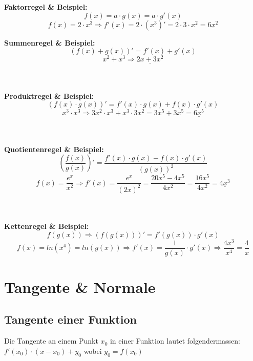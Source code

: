 \documentclass[12pt]{scrartcl}
\begin{document}
\begin{center}
\textbf{Faktorregel \& Beispiel:} 
\[ f(x) = a \cdot g(x) = a \cdot g'(x)\]
\[f(x)=2 \cdot x^3 \Rightarrow f'(x)=2 \cdot (x^3)' = 2 \cdot 3 \cdot x^2 = \underline{6x^2}\]

\newpage
\textbf{Summenregel \& Beispiel:} 
\[ (f(x) + g(x))' = f'(x) + g'(x) \]
\[ x^2 + x^3 \Rightarrow \underline{2x + 3x^2}\]

\hspace{0pt} \\
\hspace{0pt} \\
\noindent
\textbf{Produktregel \& Beispiel:} 
\[ (f(x) \cdot g(x))' =  f'(x) \cdot g(x) + f(x) \cdot g'(x)\]
\[x^3 \cdot x^3 \Rightarrow 3x^2 \cdot x^3 + x^3 \cdot 3x^2 = 3x^5 + 3x^5 = \underline{6x^5}\]


\hspace{0pt} \\
\hspace{0pt} \\
\noindent
\textbf{Quotientenregel \& Beispiel:} 
\[\left(\frac{f(x)}{g(x)}\right)' = \frac{f'(x) \cdot g(x) - f(x) \cdot g'(x)}{(g(x))^2}\]
\[f(x)= \frac{e^x}{x^2} \Rightarrow f'(x) = \frac{e^x}{(2x)^2} = \frac{20x^5 - 4x^5}{4x^2} = \frac{16x^5}{4x^2} = \underline{4x^3}\]

\hspace{0pt} \\
\hspace{0pt} \\
\noindent
\textbf{Kettenregel \& Beispiel:} 
\[f(g(x)) \Rightarrow (f(g(x)))' = f'(g(x)) \cdot g'(x)\]
\[f(x) = ln(x^4) = ln(g(x)) \Rightarrow f'(x) = \frac{1}{g(x)} \cdot g'(x) \Rightarrow \frac{4x^3}{x^4} = \frac{4}{x}\]


\end{center}

\newpage

\section{Tangente \& Normale}
\subsection{Tangente einer Funktion}
Die Tangente an einem Punkt $x_0$ in einer Funktion lautet folgendermassen:\\
$ f'(x_0) \cdot (x - x_0) + y_0$ wobei $y_0 = f(x_0)$\\
\end{document}
